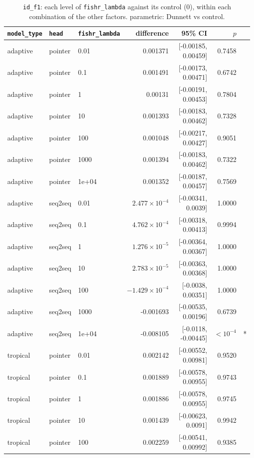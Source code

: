 \documentclass[10pt]{article}
\begin{document}
{\small
\begin{longtable}{lllrrrl}
\caption{\texttt{id\_f1}: each level of \texttt{fishr\_lambda} against its control (0), within each combination of the other factors. parametric: Dunnett vs control.}\label{tab:control-id_f1}\\
\toprule
\texttt{model\_type} & \texttt{head} & \texttt{fishr\_lambda} & difference & 95\% CI & $p$ & \\
\midrule
\endhead
adaptive & pointer & 0.01 & 0.001371 & [-0.00185, 0.00459] & 0.7458 & \\
adaptive & pointer & 0.1 & 0.001491 & [-0.00173, 0.00471] & 0.6742 & \\
adaptive & pointer & 1 & 0.00131 & [-0.00191, 0.00453] & 0.7804 & \\
adaptive & pointer & 10 & 0.001393 & [-0.00183, 0.00462] & 0.7328 & \\
adaptive & pointer & 100 & 0.001048 & [-0.00217, 0.00427] & 0.9051 & \\
adaptive & pointer & 1000 & 0.001394 & [-0.00183, 0.00462] & 0.7322 & \\
adaptive & pointer & 1e+04 & 0.001352 & [-0.00187, 0.00457] & 0.7569 & \\
adaptive & seq2seq & 0.01 & $2.477\times10^{-4}$ & [-0.00341, 0.0039] & 1.0000 & \\
adaptive & seq2seq & 0.1 & $4.762\times10^{-4}$ & [-0.00318, 0.00413] & 0.9994 & \\
adaptive & seq2seq & 1 & $1.276\times10^{-5}$ & [-0.00364, 0.00367] & 1.0000 & \\
adaptive & seq2seq & 10 & $2.783\times10^{-5}$ & [-0.00363, 0.00368] & 1.0000 & \\
adaptive & seq2seq & 100 & $-1.429\times10^{-4}$ & [-0.0038, 0.00351] & 1.0000 & \\
adaptive & seq2seq & 1000 & -0.001693 & [-0.00535, 0.00196] & 0.6739 & \\
adaptive & seq2seq & 1e+04 & -0.008105 & [-0.0118, -0.00445] & $<10^{-4}$ & *\\
tropical & pointer & 0.01 & 0.002142 & [-0.00552, 0.00981] & 0.9520 & \\
tropical & pointer & 0.1 & 0.001889 & [-0.00578, 0.00955] & 0.9743 & \\
tropical & pointer & 1 & 0.001886 & [-0.00578, 0.00955] & 0.9745 & \\
tropical & pointer & 10 & 0.001439 & [-0.00623, 0.0091] & 0.9942 & \\
tropical & pointer & 100 & 0.002259 & [-0.00541, 0.00992] & 0.9385 & \\

\end{longtable}}
\end{document}
